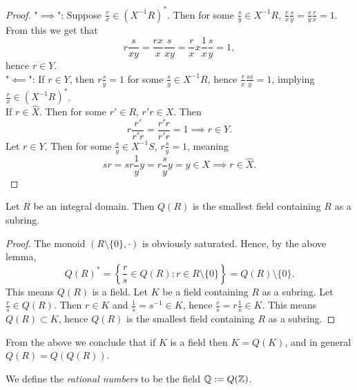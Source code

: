 \begin{proof}
    "$\implies$": Suppose $\frac{r}{x}\in \left(X^{-1}R\right)^\ast$. Then for some $\frac{s}{y}\in X^{-1}R$, $\frac{r}{x}\frac{s}{y}=\frac{s}{y}\frac{r}{x}=1$.  From this we get that 
    $$r \frac{s}{xy} = \frac{rx}{x}\frac{s}{xy}= \frac{r}{x}x\frac{1}{x}\frac{s}{y} = 1,$$
    hence $r\in Y$.\\
    "$\impliedby$": If $r \in Y$, then $r \frac{s}{y}=1$ for some $\frac{s}{y}\in X^{-1}R$, hence $\frac{r}{x}\frac{sx}{y} = 1$, implying $\frac{r}{x} \in \left( X^{-1}R\right)^\ast$.\\
    If $r \in \widehat{X}$. Then for some $r'\in R$, $r'r\in X$. Then 
    $$r\frac{r'}{r'r} = \frac{r'r}{r'r} = 1 \implies r\in Y.$$
    Let $r \in Y$. Then for some $\frac{s}{y}\in X^{-1}S$, $r\frac{s}{y}=1$, meaning
    $$sr = sr \frac{1}{y}y = r\frac{s}{y}y= y \in X \implies r \in \widehat{X}.$$
\end{proof}
\begin{proposition}
    Let $R$ be an integral domain. Then $Q(R)$ is the smallest field containing $R$ as a subring. 
\end{proposition}
\begin{proof}
    The monoid $(R\setminus\{0\}, \cdot)$ is obviously saturated. Hence, by the above lemma,
    $$Q(R)^\ast = \left\{ \frac{r}{s}\in Q(R) : r\in R\setminus\{0\} \right\} = Q(R)\setminus\{0\}.$$
    This means $Q(R)$ is a field. Let $K$ be a field containing $R$ as a subring. Let $\frac{r}{s}\in Q(R)$. Then $r \in K$ and $\frac{1}{s}=s^{-1} \in K$, hence $\frac{r}{s} = r \frac{1}{s} \in K$. This means $Q(R) \subset K$, hence $Q(R)$ is the smallest field containing $R$ as a subring. 
\end{proof}
\begin{remark}
    From the above we conclude that if $K$ is a field then $K = Q(K)$, and in general $Q(R) =  Q(Q(R))$.
\end{remark}
\begin{definition}
    We define the \textit{rational numbers} to be the field $\mathbb{Q} := Q(\mathbb{Z})$.
\end{definition}

